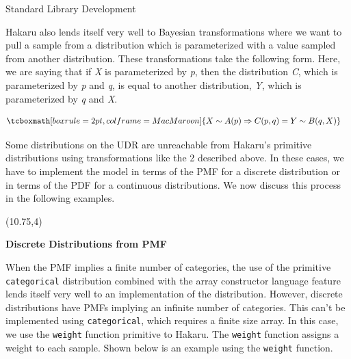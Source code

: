 \documentclass[22pt]{beamer}
\newenvironment{variableblock}[3]{%
  \setbeamercolor{block body}{#2}
  \setbeamercolor{block title}{#3}
  \begin{block}{#1}}{\end{block}}
\begin{document}
\begin{frame}[fragile]
\begin{textblock}{5}
\begin{textblock}{5}
\begin{block}{Standard Library Development}
\bigskip

\tiny{Hakaru also lends itself very well to Bayesian transformations where we want to pull a sample from a distribution which is parameterized with a value sampled from another distribution. These transformations take the following form. Here, we are saying that if \textit{X} is parameterized by \textit{p}, then the distribution \textit{C}, which is parameterized by \textit{p} and \textit{q}, is equal to another distribution, \textit{Y}, which is parameterized by \textit{q} and \textit{X}.}

\begin{equation*}
\begin{aligned}
& \tcboxmath[boxrule=2pt,colframe=MacMaroon]{X \sim A(p) \Rightarrow C(p, q) = Y \sim B(q, X)}
\end{aligned}
\end{equation*}

\bigskip

Some distributions on the UDR are unreachable from Hakaru's primitive distributions using transformations like the 2 described above. In these cases, we have to implement the model in terms of the PMF for a discrete distribution or in terms of the PDF for a continuous distributions. We now discuss this process in the following examples. 

\end{block}

\end{textblock}

\end{textblock}


\begin{textblock}{5}(10.75,4)


\begin{variableblock}{}{}{}
\justifying

\small{\textbf{Discrete Distributions from PMF}}

\bigskip

\tiny{When the PMF implies a finite number of categories, the use of the primitive {\tt \tiny{categorical}} distribution combined with the array constructor language feature lends itself very well to an implementation of the distribution. However, discrete distributions have PMFs implying an infinite number of categories. This can’t be implemented using {\tt \tiny{categorical}}, which requires a finite size array. In this case, we use the {\tt \tiny{weight}} function primitive to Hakaru. The {\tt \tiny{weight}} function assigns a weight to each sample. Shown below is an example using the {\tt \tiny{weight}} function.
}


\end{variableblock}
\end{textblock}
\end{frame}
\end{document}
